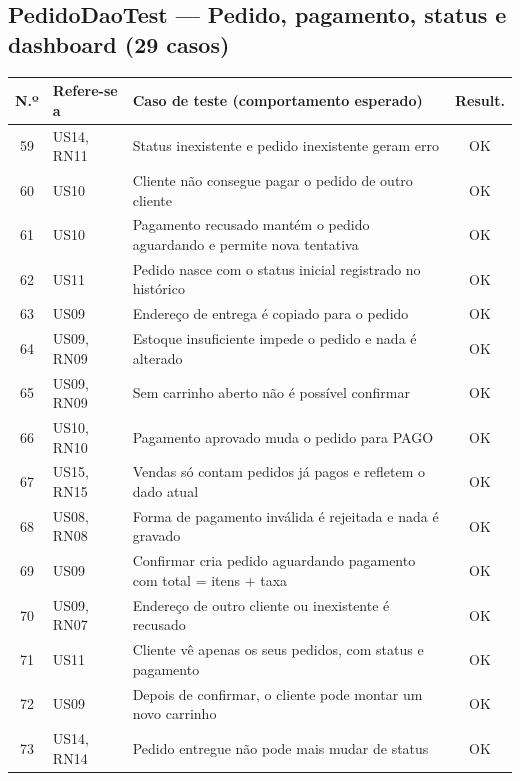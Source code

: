 \subsection*{PedidoDaoTest --- Pedido, pagamento, status e dashboard (29 casos)}
\footnotesize
\begin{longtable}{|c|p{2.5cm}|p{8.4cm}|c|}
\hline
\rowcolor{gray!30} \textbf{N.º} & \textbf{Refere-se a} & \textbf{Caso de teste (comportamento esperado)} & \textbf{Result.} \\ \hline
\endhead
59 & US14, RN11 & Status inexistente e pedido inexistente geram erro & \cellcolor{green!20}OK \\ \hline
60 & US10 & Cliente não consegue pagar o pedido de outro cliente & \cellcolor{green!20}OK \\ \hline
61 & US10 & Pagamento recusado mantém o pedido aguardando e permite nova tentativa & \cellcolor{green!20}OK \\ \hline
62 & US11 & Pedido nasce com o status inicial registrado no histórico & \cellcolor{green!20}OK \\ \hline
63 & US09 & Endereço de entrega é copiado para o pedido & \cellcolor{green!20}OK \\ \hline
64 & US09, RN09 & Estoque insuficiente impede o pedido e nada é alterado & \cellcolor{green!20}OK \\ \hline
65 & US09, RN09 & Sem carrinho aberto não é possível confirmar & \cellcolor{green!20}OK \\ \hline
66 & US10, RN10 & Pagamento aprovado muda o pedido para PAGO & \cellcolor{green!20}OK \\ \hline
67 & US15, RN15 & Vendas só contam pedidos já pagos e refletem o dado atual & \cellcolor{green!20}OK \\ \hline
68 & US08, RN08 & Forma de pagamento inválida é rejeitada e nada é gravado & \cellcolor{green!20}OK \\ \hline
69 & US09 & Confirmar cria pedido aguardando pagamento com total = itens + taxa & \cellcolor{green!20}OK \\ \hline
70 & US09, RN07 & Endereço de outro cliente ou inexistente é recusado & \cellcolor{green!20}OK \\ \hline
71 & US11 & Cliente vê apenas os seus pedidos, com status e pagamento & \cellcolor{green!20}OK \\ \hline
72 & US09 & Depois de confirmar, o cliente pode montar um novo carrinho & \cellcolor{green!20}OK \\ \hline
73 & US14, RN14 & Pedido entregue não pode mais mudar de status & \cellcolor{green!20}OK \\ \hline

\end{longtable}
